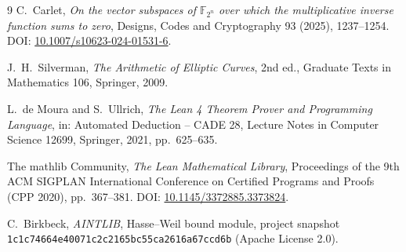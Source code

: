 \documentclass[UTF8,a4paper,11pt]{ctexart}
\numberwithin{equation}{section}
\theoremstyle{definition}
\theoremstyle{remark}
\begin{document}
\sloppy\begin{thebibliography}{9}\small
{}
C.~Carlet, \emph{On the vector subspaces of $\mathbb F_{2^n}$ over which the multiplicative inverse function sums to zero}, Designs, Codes and Cryptography 93 (2025), 1237--1254. DOI: \href{https://doi.org/10.1007/s10623-024-01531-6}{10.1007/s10623-024-01531-6}.

J.~H.~Silverman, \emph{The Arithmetic of Elliptic Curves}, 2nd ed., Graduate Texts in Mathematics 106, Springer, 2009.

L.~de Moura and S.~Ullrich, \emph{The Lean 4 Theorem Prover and Programming Language}, in: Automated Deduction -- CADE 28, Lecture Notes in Computer Science 12699, Springer, 2021, pp.~625--635.

The mathlib Community, \emph{The Lean Mathematical Library}, Proceedings of the 9th ACM SIGPLAN International Conference on Certified Programs and Proofs (CPP 2020), pp.~367--381. DOI: \href{https://doi.org/10.1145/3372885.3373824}{10.1145/3372885.3373824}.

C.~Birkbeck, \emph{AINTLIB}, Hasse--Weil bound module, project snapshot \texttt{1c1c7466\allowbreak 4e40071c\allowbreak 2c2165bc\allowbreak 55ca2616\allowbreak a67ccd6b} (Apache License 2.0).
\end{thebibliography}
\end{document}
